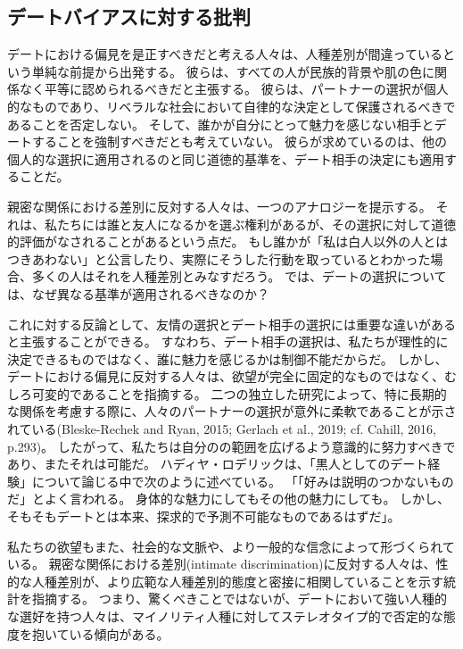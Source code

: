 \documentclass[paper=a4,book,openany]{jlreq}
\begin{document}
\subsection{デートバイアスに対する批判}

デートにおける偏見を是正すべきだと考える人々は、人種差別が間違っているという単純な前提から出発する。
彼らは、すべての人が民族的背景や肌の色に関係なく平等に認められるべきだと主張する。
彼らは、パートナーの選択が個人的なものであり、リベラルな社会において自律的な決定として保護されるべきであることを否定しない。
そして、誰かが自分にとって魅力を感じない相手とデートすることを強制すべきだとも考えていない。
彼らが求めているのは、他の個人的な選択に適用されるのと同じ道徳的基準を、デート相手の決定にも適用することだ。

親密な関係における差別に反対する人々は、一つのアナロジーを提示する。
それは、私たちには誰と友人になるかを選ぶ権利があるが、その選択に対して道徳的評価がなされることがあるという点だ。
もし誰かが「私は白人以外の人とはつきあわない」と公言したり、実際にそうした行動を取っているとわかった場合、多くの人はそれを人種差別とみなすだろう。
では、デートの選択については、なぜ異なる基準が適用されるべきなのか？

これに対する反論として、友情の選択とデート相手の選択には重要な違いがあると主張することができる。
すなわち、デート相手の選択は、私たちが理性的に決定できるものではなく、誰に魅力を感じるかは制御不能だからだ。
しかし、デートにおける偏見に反対する人々は、欲望が完全に固定的なものではなく、むしろ可変的であることを指摘する。
二つの独立した研究によって、特に長期的な関係を考慮する際に、人々のパートナーの選択が意外に柔軟であることが示されている(Bleske-Rechek and Ryan, 2015; Gerlach et al., 2019; cf. Cahill, 2016, p.293)。
\nocite{bleske-rechek15:_contin_chang_emerg,gerlach19:_predic_valid_adjus}
\nocite{cahill16:_sexual_desir_inequal_possib_trans}
したがって、私たちは自分のの範囲を広げるよう意識的に努力すべきであり、またそれは可能だ。
ハディヤ・ロデリックは、「黒人としてのデート経験」について論じる中で次のように述べている。
「「好みは説明のつかないものだ」とよく言われる。
身体的な魅力にしてもその他の魅力にしても。
しかし、そもそもデートとは本来、探求的で予測不可能なものであるはずだ」\citep{roderique17:_datin_black}。

私たちの欲望もまた、社会的な文脈や、より一般的な信念によって形づくられている。
親密な関係における差別(intimate discrimination)に反対する人々は、性的な人種差別が、より広範な人種差別的態度と密接に相関していることを示す統計を指摘する。
つまり、驚くべきことではないが、デートにおいて強い人種的な選好を持つ人々は、マイノリティ人種に対してステレオタイプ的で否定的な態度を抱いている傾向がある\citep{callander15:_is_sexual_racis_reall_racis}。
\end{document}
